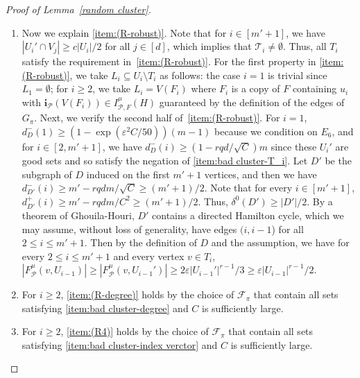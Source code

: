 \documentclass[11pt, letterpaper]{amsart}
\theoremstyle{plain}
\numberwithin{equation}{section}
\theoremstyle{definition}
\newcommand\card[1]{\left| #1 \right|}
\renewcommand{\vec}[1]{{\mathbf #1}}
\begin{document}
\begin{proof}[Proof of Lemma~\ref{random cluster}]
\begin{enumerate}[label=(\arabic*)]
\item Now we explain \ref{item:(R-robust)}. Note that for \(i\in [m'+1]\), we have $|U_i'\cap V_j|\ge c|U_i|/2$ for all \(j\in [d]\), which implies that \(\mathcal{T}_i\neq \emptyset\). 
Thus, all \(T_i\) satisfy the requirement in~\ref{item:(R-robust)}. 
For the first property in \ref{item:(R-robust)}, we take $L_i\subseteq U_i\setminus T_i$ as follows: the case \(i=1\) is trivial since \(L_1=\emptyset\); for $i\ge 2$, we take $L_i=V(F_i)$ where $F_i$ is a copy of $F$ containing $u_i$ with $\vec{i}_{\mathcal{P}}(V(F_i))\in I_{\mathcal{P},F}^{\mu}(H)$ guaranteed by the definition of the edges of $G_{\pi}$.
Next, we verify the second half of~\ref{item:(R-robust)}.
For $i=1$, $d_D^-(1)\ge (1-\exp{(\varepsilon^2C/50)})(m-1)$ because we condition on $E_6$, and for $i\in[2,m'+1]$, we have $d_D^-(i)\ge (1-rqd/\sqrt{C})m$ since these $U_i'$ are good sets and so satisfy the negation of \ref{item:bad cluster-T_i}. 
            Let $D'$ be the subgraph of $D$ induced on the first $m'+1$ vertices, and then we have $d_{D'}^-(i)\ge m'-rqdm/\sqrt{C}\ge (m'+1)/2$. Note that for every $i\in [m'+1]$, $d_{D'}^+(i)\ge m'-rqdm/C^2\ge (m'+1)/2$.
            Thus, $\delta^0(D')\ge \card{D'}/2$. By a theorem of Ghouila-Houri\cite{ghouila1960condition}, $D'$ contains a directed Hamilton cycle, which we may assume, without loss of generality, have edges \((i,i-1\)) for all \(2\le i\le m'+1\). 
            Then by the definition of $D$ and the assumption, we have for every $2\le i\le m'+1$ and every vertex $v\in T_{i}$, $\card{F^{\mu}_{\mathcal{P}}(v, U_{i-1})}\ge \card{F^{\mu}_{\mathcal{P}}(v, U_{i-1}')}\ge 2\varepsilon{\card{U_{i-1}'}}^{r-1}/3\ge \varepsilon{\card{U_{i-1}}}^{r-1}/2.$

            \item For $i\ge 2$, \ref{item:(R-degree)} holds by the choice of $\mathcal{F}_{\pi}$ that contain all sets satisfying \ref{item:bad cluster-degree} and \(C\) is sufficiently large.
            
            \item For $i\ge 2$, \ref{item:(R4)} holds by the choice of $\mathcal{F}_{\pi}$ that contain all sets satisfying \ref{item:bad cluster-index verctor} and  \(C\) is sufficiently large.
            

\end{enumerate}
\end{proof}
\end{document}

